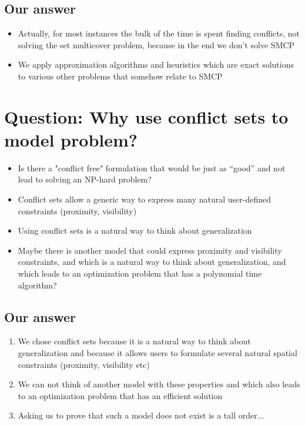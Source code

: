 \documentclass[11pt, oneside]{article}   	%
\begin{document}
\subsection{Our answer}

\begin{itemize}
\item Actually, for most instances the bulk of the time is spent finding conflicts, not solving the set multicover problem, because in the end we don't solve SMCP
\item We apply approximation algorithms and heuristics which are exact solutions to various other problems that somehow relate to SMCP
\end{itemize}

\section{Question: Why use conflict sets to model problem?}

\begin{itemize}
\item Is there a "conflict free" formulation that would be just as ``good'' and not lead to solving an NP-hard problem?
\item Conflict sets allow a generic way to express many natural user-defined constraints (proximity, visibility)
\item Using conflict sets is a natural way to think about generalization
\item Maybe there is another model that could express proximity and visibility constraints, and which is a natural way to think about generalization, and which leads to an optimization problem that has a polynomial time algorithm?
\end{itemize}

\subsection{Our answer}

\begin{enumerate}
\item We chose conflict sets because it is a natural way to think about generalization and because it allows users to formulate several natural spatial constraints (proximity, visibility etc)
\item We can not think of another model with these properties and which also leads to an optimization problem that has an efficient solution
\item Asking us to prove that such a model does not exist is a tall order...
\end{enumerate}


\end{document}
